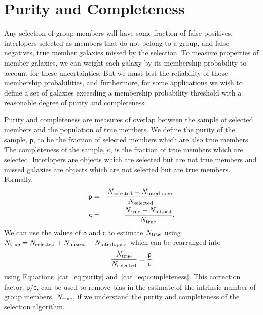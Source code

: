 
\section{Purity and Completeness}
\label{cat_s:tests}

Any selection of group members will have some fraction of false
positives, interlopers selected as members that do not belong to a
group, and false negatives, true member galaxies missed by the
selection. To measure properties of member galaxies, we can weight
each galaxy by its membership probability to account for these
uncertainties. But we must test the reliability of those membership
probabilities, and furthermore, for some applications we wish to
define a set of galaxies exceeding a membership probability threshold
with a reasonable degree of purity and completeness.

Purity and completeness are measures of overlap between the sample of
selected members and the population of true members. We define the purity
of the sample, $\mathsf{p}$, to be the fraction of selected members
which are also true members. The completeness of the sample,
$\mathsf{c}$, is the fraction of true members which are
selected. Interlopers are objects which are selected but are not true
members and missed galaxies are objects which are not selected but are
true members. Formally, 
\begin{eqnarray}
\label{cat_eq:purity} 
\mathsf{p} &=& \frac{N_{\rm selected}-N_{\rm interlopers}}{N_{\rm selected}} \\
\mathsf{c} &=& \frac{N_{\rm true}-N_{\rm missed}}{N_{\rm true}}.
\label{cat_eq:completeness}
\end{eqnarray}
We can use the values of $\mathsf{p}$ and $\mathsf{c}$ to estimate
$N_{\rm true}$ using $N_{\rm true}=N_{\rm selected}+N_{\rm
  missed}-N_{\rm interlopers}$ which can be rearranged into 
\begin{equation}
\frac{N_{\rm true}}{N_{\rm selected}}=\mathsf{\frac{p}{c}}
\label{cat_eq:correction}
\end{equation}
using Equations~\ref{cat_eq:purity} and~\ref{cat_eq:completeness}. This
correction factor, $\mathsf{p}/\mathsf{c}$, can be used to remove bias in the estimate
of the intrinsic number of group members, $N_{\rm true}$, if we understand the purity and
completeness of the selection algorithm.

